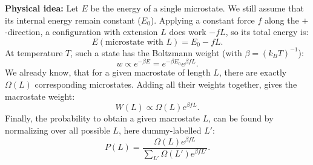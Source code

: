 \documentclass[11pt]{article}
\begin{document}
\textbf{Physical idea:} Let $E$ be the energy of a single microstate. We still assume that its internal energy remain constant ($E_0$). Applying a constant force $f$ along the $+$-direction, a configuration with extension $L$ does work $-fL$, so its total energy is:
\begin{equation}
\label{eq:microstate-energy}
  E(\text{microstate with }L) = E_0 - fL.
\end{equation}
At temperature $T$, such a state has the Boltzmann weight (with $\beta = (k_B T)^{-1}$):
\begin{equation}
  w \propto e^{-\beta E} = e^{-\beta E_0}e^{\beta f L}.
\end{equation}
We already know, that for a given macrostate of length $L$, there are exactly $\Omega(L)$ corresponding microstates. Adding all their weights together, gives the macrostate weight:
\begin{equation}
  W(L) \propto \Omega(L) e^{\beta f L}.
\end{equation}
Finally, the probability to obtain a given macrostate $L$, can be found by normalizing over all possible $L$, here dummy-labelled $L'$:
\begin{equation}
  P(L) = \frac{\Omega(L) e^{\beta f L}}{\sum_{L'} \Omega(L') e^{\beta f L'}}.
\end{equation}
\end{document}
